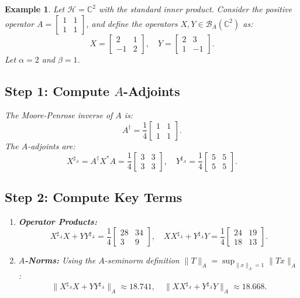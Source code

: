 \documentclass{article}
\newtheorem{example}[theorem]{Example}
\begin{document}
\begin{example}
Let $\mathcal{H} = \mathbb{C}^2$ with the standard inner product. Consider the positive operator $A = \begin{bmatrix} 1 & 1 \\ 1 & 1 \end{bmatrix}$, and define the operators $X, Y \in \mathcal{B}_A(\mathbb{C}^2)$ as:
\[
X = \begin{bmatrix} 2 & 1 \\ -1 & 2 \end{bmatrix}, \quad Y = \begin{bmatrix} 2 & 3 \\ 1 & -1 \end{bmatrix}.
\]
Let $\alpha = 2$ and $\beta = 1$.

\subsection*{Step 1: Compute $A$-Adjoints}
The Moore-Penrose inverse of $A$ is:
\[
A^\dagger = \frac{1}{4} \begin{bmatrix} 1 & 1 \\ 1 & 1 \end{bmatrix}.
\]
The $A$-adjoints are:
\[
X^{\sharp_A} = A^\dagger X^* A = \frac{1}{4} \begin{bmatrix} 3 & 3 \\ 3 & 3 \end{bmatrix}, \quad Y^{\sharp_A} = \frac{1}{4} \begin{bmatrix} 5 & 5 \\ 5 & 5 \end{bmatrix}.
\]
\subsection*{Step 2: Compute Key Terms}
\begin{enumerate}
    \item \textbf{Operator Products:}
    \[
    X^{\sharp_A}X + YY^{\sharp_A} = \frac{1}{4} \begin{bmatrix} 28 & 34 \\ 3 & 9 \end{bmatrix}, \quad XX^{\sharp_A} + Y^{\sharp_A}Y = \frac{1}{4} \begin{bmatrix} 24 & 19 \\ 18 & 13 \end{bmatrix}.
    \]

    \item \textbf{$A$-Norms:}
    Using the $A$-seminorm definition $\|T\|_A = \sup_{\|x\|_A=1} \|Tx\|_A$:
    \[
    \|X^{\sharp_A}X + YY^{\sharp_A}\|_A \approx 18.741, \quad \|XX^{\sharp_A} + Y^{\sharp_A}Y\|_A \approx 18.668.
    \]


\end{enumerate}
\end{example}
\end{document}
